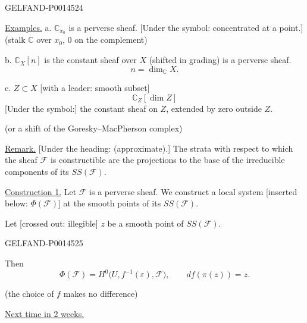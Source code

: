 \begin{GelfandAdjacentEvidence}{GELFAND-P001452}{4}


\uline{Examples.}
a. \(\mathbb C_{x_0}\) is a perverse sheaf.
[Under the symbol: concentrated at a point.]
(stalk \(\mathbb C\) over \(x_0\), \(0\) on the complement)

b. \(\mathbb C_X[n]\) is the constant sheaf over \(X\)
(shifted in grading) is a perverse sheaf.
\[
n=\dim_{\mathbb C}X.
\]

c. \(Z\subset X\) [with a leader: smooth subset]
\[
\mathbb C_Z[\dim Z]
\]
[Under the symbol:] the constant sheaf on \(Z\), extended by zero outside \(Z\).

(or a shift of the Goresky–MacPherson complex)

\uline{Remark.} [Under the heading: (approximate).]
The strata with respect to which the sheaf \(\mathcal F\) is constructible are the projections to the base of the irreducible components of its \(SS(\mathcal F)\).

\uline{Construction 1.}
Let \(\mathcal F\) is a perverse sheaf.
We construct a local system [inserted below: \(\Phi(\mathcal F)\)]
at the smooth points of its \(SS(\mathcal F)\).

Let [crossed out: illegible]
\(z\) be a smooth point of \(SS(\mathcal F)\).
\end{GelfandAdjacentEvidence}
\begin{GelfandAdjacentEvidence}{GELFAND-P001452}{5}

Then
\begin{equation*}
\Phi(\mathcal{F})=
H^{0}\bigl(U,f^{-1}(\varepsilon),\mathcal{F}\bigr),
\qquad df(\pi(z))=z. \tag{11}
\end{equation*}
\end{GelfandAdjacentEvidence}

(the choice of \(f\) makes no difference)

\uline{Next time in 2 weeks.}


